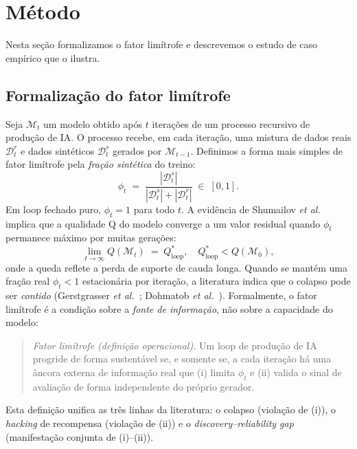 \section{Método}\label{sec:metodo}

Nesta seção formalizamos o fator limítrofe e descrevemos o estudo de caso
empírico que o ilustra.

\subsection{Formalização do fator limítrofe}

Seja $\mathcal{M}_t$ um modelo obtido após $t$ iterações de um processo
recursivo de produção de IA. O processo recebe, em cada iteração, uma mistura de
dados reais $\mathcal{D}_t^r$ e dados sintéticos $\mathcal{D}_t^s$ gerados por
$\mathcal{M}_{t-1}$. Definimos a forma mais simples de fator limítrofe pela
\emph{fração sintética} do treino:
\[
\phi_t \;=\; \frac{|\mathcal{D}_t^s|}{|\mathcal{D}_t^s| + |\mathcal{D}_t^r|}
      \;\in\;[0,1].
\]
Em loop fechado puro, $\phi_t = 1$ para todo $t$. A evidência de
Shumailov \textit{et al.}~\parencite{Shumailov2024Collapse} implica que a
qualidade Q do modelo converge a um valor residual quando $\phi_t$ permanece
máximo por muitas gerações:
\[
\lim_{t\to\infty} Q(\mathcal{M}_t) \;=\; Q^*_{\text{loop}},
\quad Q^*_{\text{loop}} < Q(\mathcal{M}_0),
\]
onde a queda reflete a perda de suporte de cauda longa. Quando se mantém uma
fração real $\phi_t < 1$ estacionária por iteração, a literatura indica que o
colapso pode ser \emph{contido} (Gerstgrasser \textit{et
al.}~\parencite{Gerstgrasser2024Collapse}; Dohmatob \textit{et
al.}~\parencite{Dohmatob2024CollapseScaling}). Formalmente, o fator limítrofe é
a condição sobre a \emph{fonte de informação}, não sobre a capacidade do modelo:

\begin{quote}
\emph{Fator limítrofe (definição operacional).} Um loop de produção de IA
progride de forma sustentável se, e somente se, a cada iteração há uma âncora
externa de informação real que (i) limita $\phi_t$ e (ii) valida o sinal de
avaliação de forma independente do próprio gerador.
\end{quote}

Esta definição unifica as três linhas da literatura: o colapso (violação de
(i)), o \emph{hacking} de recompensa (violação de (ii)) e o
\emph{discovery--reliability gap} (manifestação conjunta de (i)--(ii)).

